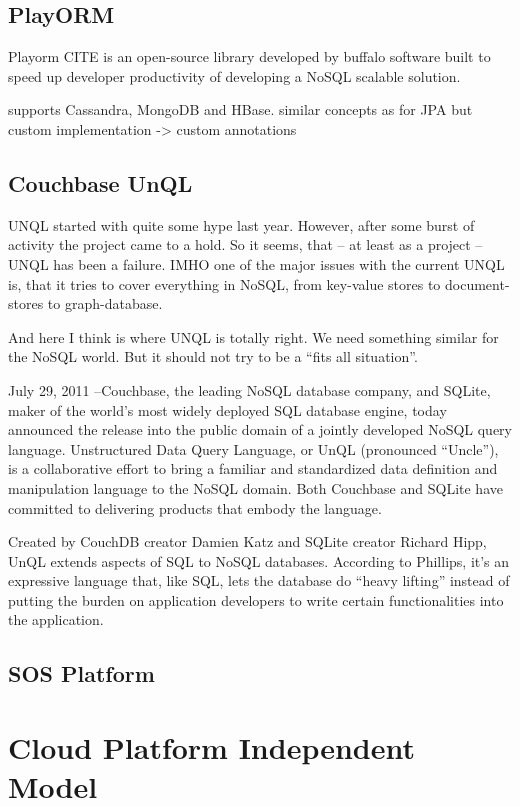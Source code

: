 \subsection{PlayORM}
Playorm  CITE is an open-source library developed by buffalo software built to speed up developer productivity of developing a NoSQL scalable solution. 

supports Cassandra, MongoDB and HBase.
similar concepts as for JPA but custom implementation -> custom annotations

\subsection{Couchbase UnQL}
UNQL started with quite some hype last year. However, after some burst of activity the project came to a hold. So it seems, that – at least as a project – UNQL has been a failure. IMHO one of the major issues with the current UNQL is, that it tries to cover everything in NoSQL, from key-value stores to document-stores to graph-database.

And here I think is where UNQL is totally right. We need something similar for the NoSQL world. But it should not try to be a “fits all situation”. 

July 29, 2011 –Couchbase, the leading NoSQL database company, and SQLite, maker of the world’s most widely deployed SQL database engine, today announced the release into the public domain of a jointly developed NoSQL query language. Unstructured Data Query Language, or UnQL (pronounced “Uncle”), is a collaborative effort to bring a familiar and standardized data definition and manipulation language to the NoSQL domain. Both Couchbase and SQLite have committed to delivering products that embody the language.

Created by CouchDB creator Damien Katz and SQLite creator Richard Hipp, UnQL extends aspects of SQL to NoSQL databases. According to Phillips, it’s an expressive language that, like SQL, lets the database do “heavy lifting” instead of putting the burden on application developers to write certain functionalities into the application.


\subsection{SOS Platform}

\section{Cloud Platform Independent Model}

